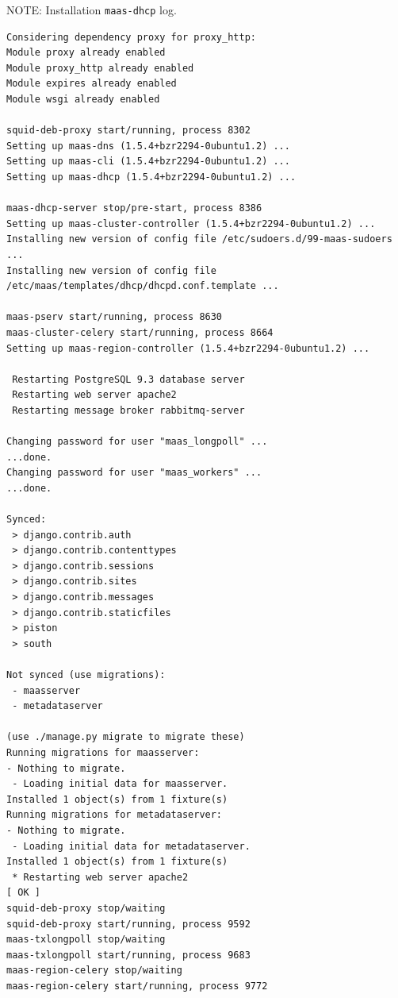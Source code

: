 NOTE: Installation \verb!maas-dhcp! log.
\begin{verbatim}
Considering dependency proxy for proxy_http:
Module proxy already enabled
Module proxy_http already enabled
Module expires already enabled
Module wsgi already enabled

squid-deb-proxy start/running, process 8302
Setting up maas-dns (1.5.4+bzr2294-0ubuntu1.2) ...
Setting up maas-cli (1.5.4+bzr2294-0ubuntu1.2) ...
Setting up maas-dhcp (1.5.4+bzr2294-0ubuntu1.2) ...

maas-dhcp-server stop/pre-start, process 8386
Setting up maas-cluster-controller (1.5.4+bzr2294-0ubuntu1.2) ...
Installing new version of config file /etc/sudoers.d/99-maas-sudoers ...
Installing new version of config file /etc/maas/templates/dhcp/dhcpd.conf.template ...

maas-pserv start/running, process 8630
maas-cluster-celery start/running, process 8664
Setting up maas-region-controller (1.5.4+bzr2294-0ubuntu1.2) ...

 Restarting PostgreSQL 9.3 database server     
 Restarting web server apache2   
 Restarting message broker rabbitmq-server     
 
Changing password for user "maas_longpoll" ...
...done.
Changing password for user "maas_workers" ...
...done.

Synced:
 > django.contrib.auth
 > django.contrib.contenttypes
 > django.contrib.sessions
 > django.contrib.sites
 > django.contrib.messages
 > django.contrib.staticfiles
 > piston
 > south

Not synced (use migrations):
 - maasserver
 - metadataserver

(use ./manage.py migrate to migrate these)
Running migrations for maasserver:
- Nothing to migrate.
 - Loading initial data for maasserver.
Installed 1 object(s) from 1 fixture(s)
Running migrations for metadataserver:
- Nothing to migrate.
 - Loading initial data for metadataserver.
Installed 1 object(s) from 1 fixture(s)
 * Restarting web server apache2                                                                                                                                                                                                                                                                                                                                    [ OK ]
squid-deb-proxy stop/waiting
squid-deb-proxy start/running, process 9592
maas-txlongpoll stop/waiting
maas-txlongpoll start/running, process 9683
maas-region-celery stop/waiting
maas-region-celery start/running, process 9772
 
\end{verbatim}

